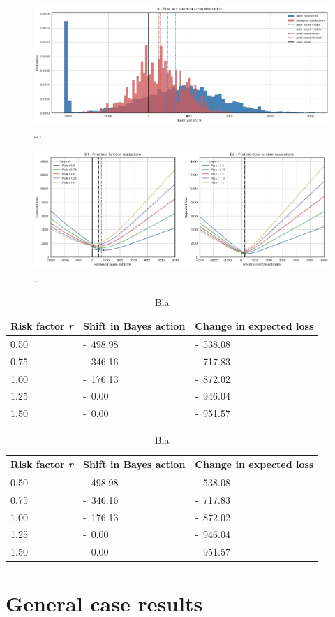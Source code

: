 	\begin{figure}[h]
			\centering
			\includegraphics[width=1\textwidth]{Figures/update_smallres2.png}
			\caption{...}\label{fig:update_smallres2} 
	\end{figure}
	
	\begin{figure}[h]
				\centering
				\includegraphics[width=1\textwidth]{Figures/update_smallres3.png}
				\caption{...}\label{fig:update_smallres3} 
	\end{figure}
			
	\begin{table}
		\centering
		\begin{tabular}[c]{| l | l | l |}
			\hline
			Risk factor \textit{r} & Shift in Bayes action & Change in expected loss \\ \hline
			0.50 & -~498.98 & -~538.08 \\ 
			0.75 & -~346.16 & -~717.83  \\ 
			1.00 & -~176.13 & -~872.02 \\ 
			1.25 & -~0.00 & -~946.04 \\ 
			1.50 & -~0.00 & -~951.57  \\ 
			\hline
		\end{tabular}
		\caption{Bla}
		\label{tab:update_smallres_tab}
	\end{table}
	
	\begin{table}
			\centering
			\begin{tabular}[c]{| l | l | l |}
				\hline
				Risk factor \textit{r} & Shift in Bayes action & Change in expected loss \\ \hline
				0.50 & -~498.98 & -~538.08 \\ 
				0.75 & -~346.16 & -~717.83  \\ 
				1.00 & -~176.13 & -~872.02 \\ 
				1.25 & -~0.00 & -~946.04 \\ 
				1.50 & -~0.00 & -~951.57  \\ 
				\hline
			\end{tabular}
			\caption{Bla}
			\label{tab:update_examples_all}
	\end{table}
		
	\section{General case results}